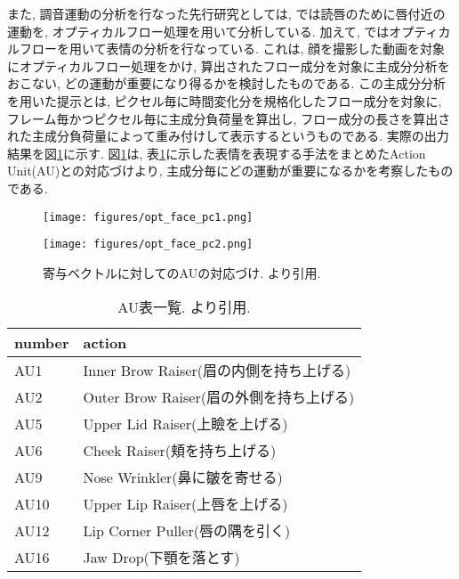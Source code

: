 また, 調音運動の分析を行なった先行研究としては, \cite{opt_dokushin}では読唇のために唇付近の運動を, オプティカルフロー処理を用いて分析している. %
加えて, \cite{opt_face}ではオプティカルフローを用いて表情の分析を行なっている. これは, 顔を撮影した動画を対象にオプティカルフロー処理をかけ, 算出されたフロー成分を対象に主成分分析をおこない, どの運動が重要になり得るかを検討したものである. この主成分分析を用いた提示とは, ピクセル毎に時間変化分を規格化したフロー成分を対象に, フレーム毎かつピクセル毎に主成分負荷量を算出し, フロー成分の長さを算出された主成分負荷量によって重み付けして表示するというものである. 実際の出力結果を図\ref{pre_AU_taiou}に示す. 図\ref{pre_AU_taiou}は, 表\ref{pre_AU_table}に示した表情を表現する手法をまとめたAction Unit(AU)\cite{pre_AU}との対応づけより, 主成分毎にどの運動が重要になるかを考察したものである.
\begin{figure}[htbp]
  \begin{minipage}[b]{0.45\linewidth}
    \centering
    \texttt{[image: figures/opt\_face\_pc1.png]}
  \end{minipage}
  \begin{minipage}[b]{0.45\linewidth}
    \centering
    \texttt{[image: figures/opt\_face\_pc2.png]}
  \end{minipage}
  \caption[寄与ベクトルに対してのAUの対応づけ]{寄与ベクトルに対してのAUの対応づけ. \cite{opt_face}より引用. }
  \label{pre_AU_taiou}
\end{figure}
\begin{table}[!ht]
    \centering
    \caption[AU表一覧]{AU表一覧. \cite{pre_AU}より引用. }
    \begin{tabular}{|l|l|}
    \hline
        number & action \\ \hline
        AU1 & Inner Brow Raiser(眉の内側を持ち上げる) \\ \hline
        AU2 & Outer Brow Raiser(眉の外側を持ち上げる) \\ \hline
        AU5 & Upper Lid Raiser(上瞼を上げる) \\ \hline
        AU6 & Cheek Raiser(頬を持ち上げる) \\ \hline
        AU9 & Nose Wrinkler(鼻に皺を寄せる) \\ \hline
        AU10 & Upper Lip Raiser(上唇を上げる) \\ \hline
        AU12 & Lip Corner Puller(唇の隅を引く) \\ \hline
        AU16 & Jaw Drop(下顎を落とす) \\ \hline
    \end{tabular}
    \label{pre_AU_table}
\end{table}
